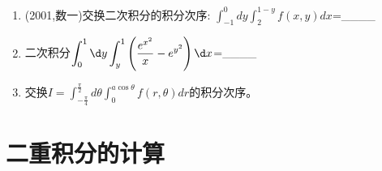 \documentclass[12pt, a4paper, oneside, UTF8]{ctexbook}
\begin{document}
\begin{enumerate}[label=\arabic*.,start=3]
    \item (2001,数一)交换二次积分的积分次序:
    $\displaystyle\int_{-1}^0 dy\int_2^{1-y} f(x,y)dx$=\_\_\_\_
    
    \begin{solution}
    \newpage
    \end{solution}
    
    \item 二次积分$\displaystyle\int_{0}^{1}\d y\int_{y}^{1}\left(\frac{e^{x^2}}{x}-e^{y^2}\right)\d x$=\_\_\_\_
    
    \begin{solution}
        \newpage
    \end{solution}
    \item 交换$\displaystyle I=\int_{-\frac{\pi}{4}}^{\frac{\pi}{2}}d\theta\int_0^{a\cos\theta}f(r,\theta)dr$的积分次序。
    
    \begin{solution}
    \newpage
    \end{solution}
\end{enumerate}

\section{二重积分的计算}
\end{document}
